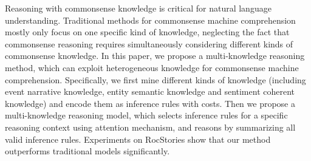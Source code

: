 Reasoning with commonsense knowledge is critical for natural language understanding. Traditional methods for commonsense machine comprehension mostly only focus on one specific kind of knowledge, neglecting the fact that commonsense reasoning requires simultaneously considering different kinds of commonsense knowledge. In this paper, we propose a multi-knowledge reasoning method, which can exploit heterogeneous knowledge for commonsense machine comprehension. Specifically, we first mine different kinds of knowledge (including event narrative knowledge, entity semantic knowledge and sentiment coherent knowledge) and encode them as inference rules with costs. Then we propose a multi-knowledge reasoning model, which selects inference rules for a specific reasoning context using attention mechanism, and reasons by summarizing all valid inference rules. Experiments on RocStories show that our method outperforms traditional models significantly.
